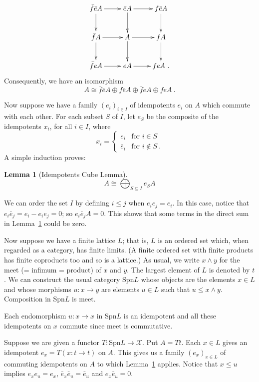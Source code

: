 \documentclass[a4paper,12pt,reqno]{amsart}
\newtheorem{lemma}[theorem]{Lemma}
\theoremstyle{definition}
\theoremstyle{fact}
\theoremstyle{genquest}
\theoremstyle{step}
\newcommand{\lra}{\longrightarrow}
\newcommand{\ra}{\rightarrow}
\def\CX{{\mathscr X}}
\begin{document}
\begin{equation*}
\xymatrix{
\bar{f}\bar{e}A \ar[d] \ar[r] & \bar{e}A \ar[d]  \ar[r] & f\bar{e}A \ar[d] \\
\bar{f}A \ar[d] \ar[r] & A \ar[d] \ar[r] & fA \ar[d]\\
\bar{f}eA \ar[r] & eA  \ar[r] & feA \ . }
\end{equation*}
Consequently, we have an isomorphism
$$A \cong  \bar{f}\bar{e}A \oplus f\bar{e}A \oplus \bar{f}eA \oplus feA \ .$$

Now suppose we have a family $(e_i)_{i\in I}$ of idempotents $e_i$ on $A$
which commute with each other. For each subset $S$ of $I$, let $e_S$ be the
composite of the idempotents $x_i$, for all $i\in I$, where
\begin{equation*}
x_i =
\begin{cases}
e_i & \text{for }  i \in S \\
\bar{e}_i & \text{for } i\notin S \ .
\end{cases}
\end{equation*}
A simple induction proves:

\begin{lemma}[Idempotents Cube Lemma]\label{CubeLem}
$$A\cong \bigoplus_{S\subseteq I}{e_SA}$$ 
\end{lemma}

We can order the set $I$ by defining $i\le j$ when $e_i e_j = e_i$. 
In this case, notice that $e_i\bar{e}_j = e_i - e_i e_j = 0$; so $e_i\bar{e}_jA = 0$.
This shows that some terms in the direct sum in Lemma~\ref{CubeLem}
could be zero. 

Now suppose we have a finite lattice $L$; that is, $L$ is an ordered set
which, when regarded as a category, has finite limits. 
(A finite ordered set with finite products has finite coproducts too and
so is a lattice.) As usual, we write
$x\wedge y$ for the meet (= infimum = product) of $x$ and $y$. 
The largest element of $L$ is denoted by $t$.
We can construct the usual category $\mathrm{Spn}L$ 
whose objects are the elements $x\in L$ and
whose morphisms $u : x \ra y$ are elements $u\in L$ such that $u\le x\wedge y$. 
Composition in $\mathrm{Spn}L$ is meet. 

Each endomorphism $u:x\ra x$ in $\mathrm{Spn}L$ is an idempotent and all these
idempotents on $x$ commute since meet is commutative.

Suppose we are given a functor $T: \mathrm{Spn}L \lra \CX$. Put $A=Tt$.
Each $x\in L$ gives an idempotent $e_x = T(x:t\ra t)$ on $A$.
This gives us a family $(e_x)_{x\in L}$ of commuting idempotents on $A$
to which Lemma~\ref{CubeLem} applies. 
Notice that $x\le u$ implies $e_x e_u = e_x$, $\bar{e}_x \bar{e}_u = \bar{e}_u$ and $e_x\bar{e}_u =0$.
\end{document}
